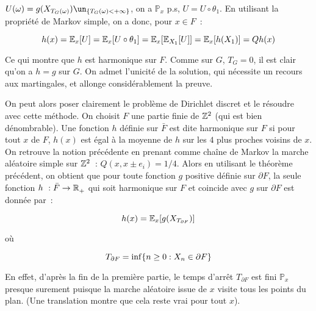 $U(\omega)= g(X_{T_G(\omega)})\un_{\ens{T_G(\omega)<+\infty}}$, on a $\mathbb{P}_x$ p.s, $U= U\circ\theta_1$.
En utilisant la propriété de Markov simple, on a donc, pour $x\in F$~:\par
$$h(x) = \mathbb{E}_{x}\lbrack U\rbrack = \mathbb{E}_{x}\lbrack U\circ\theta_1\rbrack = \mathbb{E}_{x}\lbrack \mathbb{E}_{X_1}\lbrack U\rbrack\rbrack = \mathbb{E}_{x}\lbrack h(X_1)\rbrack=Qh(x)$$\par
Ce qui montre que $h$ est harmonique sur $F$. Comme sur $G$, $T_G=0$, il est clair qu'on a $h=g$ sur $G$.
On admet l'unicité de la solution, qui nécessite un recours aux martingales, et allonge considérablement la 
preuve.\par
On peut alors poser clairement le problème de Dirichlet discret et le résoudre avec cette méthode.
On choisit $F$ une partie finie de ${\mathbb{Z}}^2$ (qui est bien dénombrable). Une fonction $h$ définie sur 
$\bar{F}$ est dite harmonique sur $F$ si pour tout $x$ de $F$, $h(x)$ est égal à la moyenne de $h$ sur les 
$4$ plus proches voisins de $x$. On retrouve la notion précédente en prenant comme chaîne de Markov la marche
aléatoire simple sur ${\mathbb{Z}}^2$~: $Q(x,x\pm e_i) = 1/4$. Alors en utilisant le théorème précédent, on obtient
que pour toute fonction $g$ positive définie sur $\partial F$, la seule fonction $h~:\bar{F}\to \mathbb{R}^{}_+$ qui 
soit harmonique sur $F$ et coincide avec $g$ sur $\partial F$ est donnée par~:\par
$$h(x) = \mathbb{E}_{x}\lbrack g(X_{T_{\partial F}})\rbrack$$\par
o\`u\par
$$T_{\partial F} = \inf\{n\geq 0 : X_n\in \partial F\}$$\par
En effet, d'après la fin de la première partie, le temps d'arrêt $T_{\partial F}$ est fini 
$\mathbb{P}_x$ presque surement puisque la marche aléatoire issue de $x$ visite tous les points du plan. 
(Une translation montre que cela reste vrai pour tout $x$).\par


